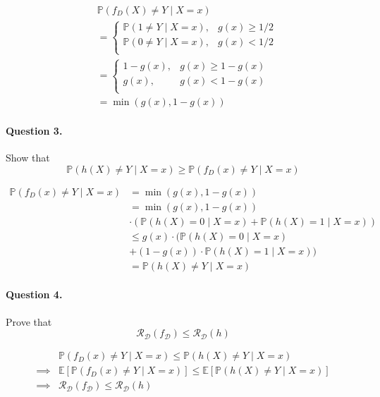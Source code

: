 \documentclass{article}
\newcommand{\1}{\mathbf{1}}
\newcommand{\E}{\mathbb{E}}
\renewcommand{\P}{\mathbb{P}}
\begin{document}
\begin{align*}
   & \P(f_D (X) \neq Y \mid X = x) \\
   & =
  \begin{cases}
    \P(1 \neq Y \mid X = x), & g(x) \geq 1/2 \\
    \P(0 \neq Y \mid X = x), & g(x) < 1/2    \\
  \end{cases}        \\
   & =
  \begin{cases}
    1 - g(x), & g(x) \geq 1-g(x) \\
    g(x),     & g(x) < 1 - g(x)  \\
  \end{cases}        \\
   & = \min (g(x), 1-g(x))
\end{align*}

\paragraph{Question 3.}
Show that
\begin{equation*}
  \P(h(X) \neq Y \mid X=x) \geq \P (f_D(x) \neq Y \mid X=x)
\end{equation*}

\begin{align*}
  \P (f_D(x) \neq Y \mid X=x)
   & = \min (g(x), 1-g(x))                             \\
   & = \min (g(x), 1-g(x))                             \\
   & \cdot (\P(h(X)=0 \mid X=x) + \P(h(X)=1 \mid X=x)) \\
   & \leq g(x) \cdot (\P(h(X)=0 \mid X=x)              \\
   & + (1-g(x)) \cdot \P(h(X)=1 \mid X=x))             \\
   & = \P(h(X) \neq Y \mid X=x)
\end{align*}

\paragraph{Question 4.}
Prove that
\begin{equation*}
  \mathcal{R}_\mathcal{D} (f_\mathcal{D}) \leq \mathcal{R}_\mathcal{D} (h)
\end{equation*}

\begin{align*}
           &
  \P (f_D(x) \neq Y \mid X=x) \leq \P(h(X) \neq Y \mid X=x)                               \\
  \implies &
  \E\left[\P (f_D(x) \neq Y \mid X=x)\right] \leq \E\left[\P(h(X) \neq Y \mid X=x)\right] \\
  \implies &
  \mathcal{R}_\mathcal{D} (f_\mathcal{D}) \leq \mathcal{R}_\mathcal{D} (h)
\end{align*}
\end{document}
